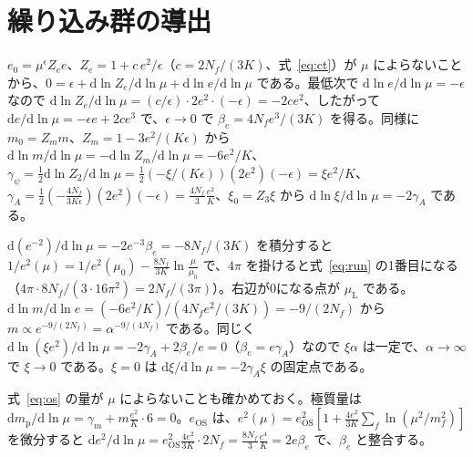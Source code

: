 \documentclass[a4paper,10pt]{ltjsarticle}
\newcommand{\dd}{\mathrm{d}}
\begin{document}
\section{繰り込み群の導出}\label{app:rg}

$e_0=\mu^\epsilon Z_ee$、$Z_e=1+c\,e^2/\epsilon$（$c=2N_f/(3K)$、式~\eqref{eq:ct}）が $\mu$ によらないことから、$0=\epsilon+\dd\ln Z_e/\dd\ln\mu+\dd\ln e/\dd\ln\mu$ である。最低次で $\dd\ln e/\dd\ln\mu=-\epsilon$ なので $\dd\ln Z_e/\dd\ln\mu=(c/\epsilon)\cdot2e^2\cdot(-\epsilon)=-2ce^2$、したがって $\dd e/\dd\ln\mu=-\epsilon e+2ce^3$ で、$\epsilon\to0$ で $\beta_e=4N_fe^3/(3K)$ を得る。同様に $m_0=Z_mm$、$Z_m=1-3e^2/(K\epsilon)$ から $\dd\ln m/\dd\ln\mu=-\dd\ln Z_m/\dd\ln\mu=-6e^2/K$、$\gamma_\psi=\frac12\dd\ln Z_2/\dd\ln\mu=\frac12(-\xi/(K\epsilon))(2e^2)(-\epsilon)=\xi e^2/K$、$\gamma_A=\frac12(-\frac{4N_f}{3K\epsilon})(2e^2)(-\epsilon)=\frac{4N_f}{3}\frac{e^2}{K}$、$\xi_0=Z_3\xi$ から $\dd\ln\xi/\dd\ln\mu=-2\gamma_A$ である。

$\dd(e^{-2})/\dd\ln\mu=-2e^{-3}\beta_e=-8N_f/(3K)$ を積分すると $1/e^2(\mu)=1/e^2(\mu_0)-\frac{8N_f}{3K}\ln\frac{\mu}{\mu_0}$ で、$4\pi$ を掛けると式~\eqref{eq:run} の1番目になる（$4\pi\cdot8N_f/(3\cdot16\pi^2)=2N_f/(3\pi)$）。右辺が0になる点が $\mu_{\mathrm L}$ である。$\dd\ln m/\dd\ln e=(-6e^2/K)/(4N_fe^2/(3K))=-9/(2N_f)$ から $m\propto e^{-9/(2N_f)}=\alpha^{-9/(4N_f)}$ である。同じく $\dd\ln(\xi e^2)/\dd\ln\mu=-2\gamma_A+2\beta_e/e=0$（$\beta_e=e\gamma_A$）なので $\xi\alpha$ は一定で、$\alpha\to\infty$ で $\xi\to0$ である。$\xi=0$ は $\dd\xi/\dd\ln\mu=-2\gamma_A\xi$ の固定点である。

式~\eqref{eq:os} の量が $\mu$ によらないことも確かめておく。極質量は $\dd m_{\mathrm p}/\dd\ln\mu=\gamma_m+m\frac{e^2}{K}\cdot6=0$。$e_{\mathrm{OS}}$ は、$e^2(\mu)=e_{\mathrm{OS}}^2[1+\frac{4e^2}{3K}\sum_f\ln(\mu^2/m_f^2)]$ を微分すると $\dd e^2/\dd\ln\mu=e_{\mathrm{OS}}^2\frac{4e^2}{3K}\cdot2N_f=\frac{8N_f}{3}\frac{e^4}{K}=2e\beta_e$ で、$\beta_e$ と整合する。
\end{document}
